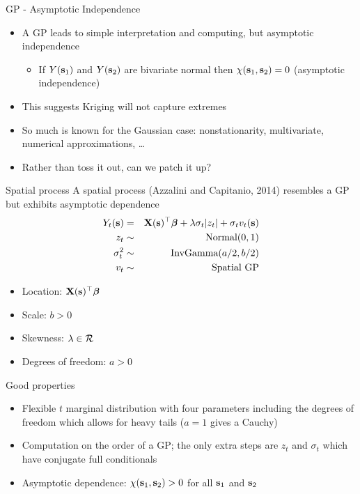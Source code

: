 \documentclass{beamer}
\begin{document}
\begin{frame}{GP - Asymptotic Independence}
	\begin{itemize}\setlength\itemsep{1em}
		\item A GP leads to simple interpretation and computing, but asymptotic independence \vspace{0.5em}
		\begin{itemize} \setlength{\itemsep}{0.5em}
			\item If $Y(\mathbf{s}_1)$ and $Y(\mathbf{s}_2)$ are bivariate normal then $\chi(\mathbf{s}_1,\mathbf{s}_2)=0$ (asymptotic independence)
		\end{itemize}
		\item This suggests Kriging will not capture extremes
		\item So much is known for the Gaussian case: nonstationarity, multivariate, numerical approximations, \ldots
		\item Rather than toss it out, can we patch it up?
	\end{itemize}
\end{frame}


\begin{frame}{Spatial \skewt{} process}
A spatial \skewt{} process (Azzalini and Capitanio, 2014)  resembles a GP but exhibits asymptotic dependence
	\begin{eqnarray}
	 	Y_t(\mathbf{s}) &=& \mathbf{X}(\mathbf{s})^\top\mbox{\boldmath $\beta$} +\lambda\sigma_t|z_t| + \sigma_tv_t(\mathbf{s})\nonumber\\
	 	z_t &\sim& \mbox{Normal}(0,1)\nonumber\\
	 	\sigma_t^2&\sim& \mbox{InvGamma}(a/2,b/2)\nonumber\\
	 	v_t&\sim& \mbox{Spatial GP}\nonumber
 	\end{eqnarray}
 	\begin{itemize}\setlength{\itemsep}{0.5em}
	 	\item Location: $\mathbf{X}(\mathbf{s})^\top\mbox{\boldmath $\beta$}$
	 	\item Scale: $b>0$
	 	\item Skewness: $\lambda\in{\cal R}$
	 	\item Degrees of freedom: $a>0$
	\end{itemize}
\end{frame}

\begin{frame}{Good properties}
 	\begin{itemize}\setlength{\itemsep}{1em}
 		\item Flexible $t$ marginal distribution with four parameters including the degrees of freedom which allows for heavy tails ($a=1$ gives a Cauchy)
 		\item Computation on the order of a GP; the only extra steps are $z_t$ and $\sigma_t$ which have conjugate full conditionals
 		\item Asymptotic dependence: $\chi(\mathbf{s}_1,\mathbf{s}_2)>0$ for all $\mathbf{s}_1$ and $\mathbf{s}_2$
 	\end{itemize}
\end{frame}
\end{document}
